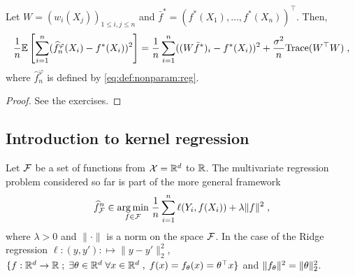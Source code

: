 \begin{shaded}
\begin{proposition}
Let  $W = (w_i(X_j))_{1\leqslant i,j \leqslant n}$ and $\bar f^* = (f^*(X_1),\ldots,f^*(X_n))^\top$. Then,
\[
\frac{1}{n}\mathbb{E}\left[\sum_{i=1}^n(\widehat f^\varphi_n(X_i) - f^*(X_i))^2\right] = \frac{1}{n}\sum_{i=1}^n((W\bar f^*)_i - f^*(X_i))^2 + \frac{\sigma^2}{n}\mathrm{Trace}(W^\top W)\;,
\]
where $\widehat f^\varphi_n$  is defined by \eqref{eq:def:nonparam:reg}.
\end{proposition}
\end{shaded}
\begin{proof}
See the exercises.
\end{proof}

\subsection{Introduction to kernel regression}
%
Let $\mathcal{F}$ be a set of functions from $\mathcal{X}=\mathbb{R}^d$ to $\mathbb{R}$. The multivariate regression problem considered so far is part of the more general framework
\begin{equation}
\label{eq:erm:rkhs}
\widehat f^n_{\calF} \in \underset{f\in\calF}{\argmin}\; \frac{1}{n}\sum_{i=1}^n \ell(Y_i,f(X_i)) + \lambda\|f\|^2\eqsp,
\end{equation}
where $\lambda>0$ and $\|\cdot\|$ is a norm on the space $\mathcal{F}$.  In the case of the Ridge regression $\ell:(y,y'): \mapsto \|y-y'\|_2^2$, $ \{f: \mathbb{R}^d\to\mathbb{R}\;;\; \exists \theta\in\mathbb{R}^d \;\forall x\in \mathbb{R}^d\;, \; f(x) =f_\theta(x)= \theta^\top x\}$ and $\|f_\theta\|^2 = \|\theta\|_2^2$.

